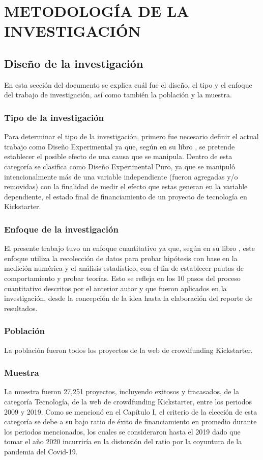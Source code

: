 \chapter{METODOLOGÍA DE LA INVESTIGACIÓN}
\section{Diseño de la investigación}
En esta sección del documento se explica cuál fue el diseño, el tipo y el enfoque del trabajo de investigación, así como también la población y la muestra. 

\subsection{Tipo de la investigación}
Para determinar el tipo de la investigación, primero fue necesario definir el actual trabajo como Diseño Experimental ya que, según \cite{bk_hernandez2014metodologia} en su libro , se pretende establecer el posible efecto de una causa que se manipula. Dentro de esta categoría se clasifica como Diseño Experimental Puro, ya que se manipuló intencionalmente más de una variable independiente (fueron agregadas y/o removidas) con la finalidad de medir el efecto que estas generan en la variable dependiente, el estado final de financiamiento de un proyecto de tecnología en Kickstarter.

\subsection{Enfoque de la investigación}
El presente trabajo tuvo un enfoque cuantitativo ya que, según \cite{bk_hernandez2014metodologia} en su libro , este enfoque utiliza la recolección de datos para probar hipótesis con base en la medición numérica y el análisis estadístico, con el fin de establecer pautas de comportamiento y probar teorías. Esto se refleja en los 10 pasos del proceso cuantitativo descritos por el anterior autor y que fueron aplicados en la investigación, desde la concepción de la idea hasta la elaboración del reporte de resultados.

\subsection{Población}
La población fueron todos los proyectos de la web de crowdfunding Kickstarter.

\subsection{Muestra}
La muestra fueron 27,251 proyectos, incluyendo exitosos y fracasados, de la categoría Tecnología, de la web de crowdfunding Kickstarter, entre los periodos 2009 y 2019. Como se mencionó en el Capítulo I, el criterio de la elección de esta categoría se debe a su bajo ratio de éxito de financiamiento en promedio durante los periodos mencionados, los cuales se consideraron hasta el 2019 dado que tomar el año 2020 incurriría en la distorsión del ratio por la coyuntura de la pandemia del Covid-19.

